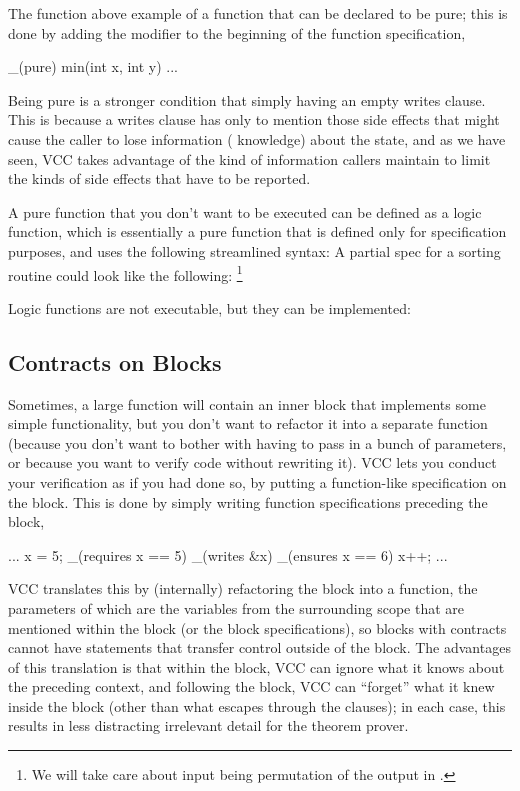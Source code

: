 The function  above
example of a function that can be declared to be pure; this is done by
adding the modifier  to the beginning of the function specification,
\eg
\begin{VCC}
_(pure) min(int x, int y) ...
\end{VCC}

Being pure is a stronger condition that simply having an empty writes
clause. This is because a writes clause has only to mention those side
effects that might cause the caller to lose information (\ie
knowledge) about the state, and as we have seen, VCC takes advantage
of the kind of information callers maintain to limit the kinds of side
effects that have to be reported.

A pure function that you don't want to be executed can be defined as a
logic function, which is essentially a pure function that is defined
only for specification purposes, and uses the following streamlined syntax:
\noindent
A partial spec for a sorting routine could look like the following:%
\footnote{We will take care about input being permutation of the output in .}

Logic functions are not executable, but they can be implemented:


\subsection{Contracts on Blocks} 

Sometimes, a large function will contain an inner block that
implements some simple functionality, but you don't want to refactor
it into a separate function (\eg because you don't want to bother with
having to pass in a bunch of parameters, or because you want to verify
code without rewriting it). VCC lets you conduct your verification as
if you had done so, by putting a function-like specification on the
block. This is done by simply writing function specifications
preceding the block, \eg
\begin{VCC}
...
x = 5;
_(requires x == 5)
_(writes &x)
_(ensures x == 6)
{
  x++;
}
...
\end{VCC}
VCC translates this by (internally) refactoring the block into a
function, the parameters of which are the variables from the
surrounding scope that are mentioned within the block (or the block
specifications), so blocks with contracts cannot have statements that
transfer control outside of the block. The advantages of this
translation is that within the block, VCC can ignore what it knows
about the preceding context, and following the block, VCC can
``forget'' what it knew inside the block (other than what escapes
through the  clauses); in each case, this results in less
distracting irrelevant detail for the theorem prover.


